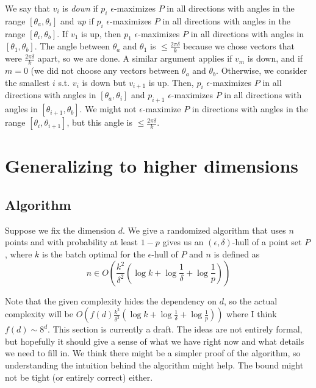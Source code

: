 \documentclass[12pt]{article}
\theoremstyle{definition}
\theoremstyle{lemma}
\theoremstyle{theorem}
\begin{document}
We say that $v_i$ is \emph{down} if $p_i$ $\epsilon$-maximizes $P$ in all directions with angles in the range $[\theta_a, \theta_i]$ and \emph{up} if $p_i$ $\epsilon$-maximizes $P$ in all directions with angles in the range $[\theta_i, \theta_b]$. If $v_1$ is up, then $p_1$ $\epsilon$-maximizes $P$ in all directions with angles in $[\theta_1, \theta_b]$. The angle between $\theta_a$ and $\theta_1$ is $\leq \frac{2\pi\delta}{k}$ because we chose vectors that were $\frac{2\pi\delta}{k}$ apart, so we are done. A similar argument applies if $v_m$ is down, and if $m = 0$ (we did not choose any vectors between $\theta_a$ and $\theta_b$. Otherwise, we consider the smallest $i$ s.t. $v_i$ is down but $v_{i+1}$ is up. Then, $p_i$ $\epsilon$-maximizes $P$ in all directions with angles in $[\theta_a, \theta_i]$ and $p_{i+1}$ $\epsilon$-maximizes $P$ in all directions with angles in $[\theta_{i+1}, \theta_b]$. We might not $\epsilon$-maximize $P$ in directions with angles in the range $[\theta_i, \theta_{i+1}]$, but this angle is $\leq \frac{2\pi\delta}{k}$.


\section{Generalizing to higher dimensions}

\subsection{Algorithm}

Suppose we fix the dimension $d$. We give a randomized algorithm that uses $n$ points and with probability at least $1-p$ gives us an $(\epsilon, \delta)$-hull of a point set $P$, where $k$ is the batch optimal for the $\epsilon$-hull of $P$ and $n$ is defined as
\[ n \in O\left(\frac{k^2}{\delta^2}\left(\log{k} + \log{\frac{1}{\delta} + \log{\frac{1}{p}} }\right)\right) \]

Note that the given complexity hides the dependency on $d$, so the actual complexity will be $O(f(d) \frac{k^2}{\delta^2}\left(\log{k} + \log{\frac{1}{\delta} + \log{\frac{1}{p}} }\right))$ where I think $f(d) \sim 8^d$. This section is currently a draft. The ideas are not entirely formal, but hopefully it should give a sense of what we have right now and what details we need to fill in. We think there might be a simpler proof of the algorithm, so understanding the intuition behind the algorithm might help. The bound might not be tight (or entirely correct) either.
\\
\end{document}
